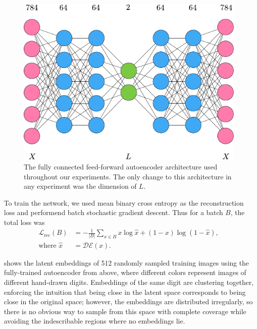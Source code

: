 \documentclass[conference]{IEEEtran}
\begin{document}
\begin{figure}[H]
	\centering
	\includegraphics[scale=0.8]{fig/architecture.pdf}
	\caption{The fully connected feed-forward autoencoder architecture used throughout our experiments. The only change to this architecture in any experiment was the dimension of $L$.}
\end{figure}

To train the network, we used mean binary cross entropy as the reconstruction loss and performend batch stochastic gradient descent. Thus for a batch $B$, the total loss was
\begin{align*}
	\mathcal{L}_{\text{rec}}(B) &= - \frac{1}{|B|} \sum_{x \in B} x \log \hat{x} + (1-x) \log(1-\hat{x}), \\
	\text{where } \hat{x} &= \mathcal{D}\mathcal{E}(x).
\end{align*}

 shows the latent embeddings of 512 randomly sampled training images using the fully-trained autoencoder from above, where different colors represent images of different hand-drawn digits. Embeddings of the same digit are clustering together, enforcing the intuition that being close in the latent space corresponds to being close in the original space; however, the embeddings are distributed irregularly, so there is no obvious way to sample from this space with complete coverage while avoiding the indescribable regions where no embeddings lie.
\end{document}
